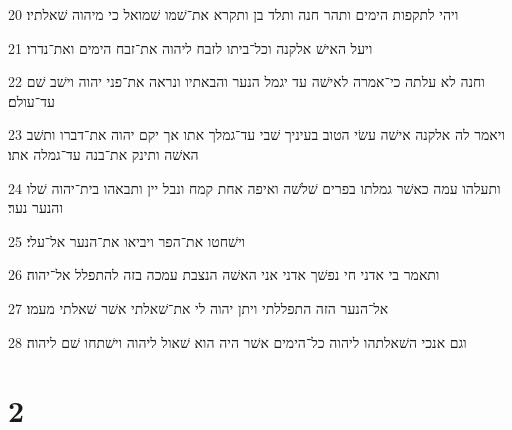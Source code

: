 \par 20 ויהי לתקפות הימים ותהר חנה ותלד בן ותקרא את־שׁמו שׁמואל כי מיהוה שׁאלתיו׃
\par 21 ויעל האישׁ אלקנה וכל־ביתו לזבח ליהוה את־זבח הימים ואת־נדרו׃
\par 22 וחנה לא עלתה כי־אמרה לאישׁה עד יגמל הנער והבאתיו ונראה את־פני יהוה וישׁב שׁם עד־עולם׃
\par 23 ויאמר לה אלקנה אישׁה עשׂי הטוב בעיניך שׁבי עד־גמלך אתו אך יקם יהוה את־דברו ותשׁב האשׁה ותינק את־בנה עד־גמלה אתו׃
\par 24 ותעלהו עמה כאשׁר גמלתו בפרים שׁלשׁה ואיפה אחת קמח ונבל יין ותבאהו בית־יהוה שׁלו והנער נער׃
\par 25 וישׁחטו את־הפר ויביאו את־הנער אל־עלי׃
\par 26 ותאמר בי אדני חי נפשׁך אדני אני האשׁה הנצבת עמכה בזה להתפלל אל־יהוה׃
\par 27 אל־הנער הזה התפללתי ויתן יהוה לי את־שׁאלתי אשׁר שׁאלתי מעמו׃
\par 28 וגם אנכי השׁאלתהו ליהוה כל־הימים אשׁר היה הוא שׁאול ליהוה וישׁתחו שׁם ליהוה׃

\chapter{2}


